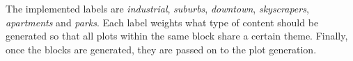 The implemented labels are \textit{industrial}, \textit{suburbs}, \textit{downtown}, \textit{skyscrapers}, \textit{apartments} and \textit{parks}.
Each label weights what type of content should be generated so that all plots within the same block share a certain theme.
Finally, once the blocks are generated, they are passed on to the plot generation.